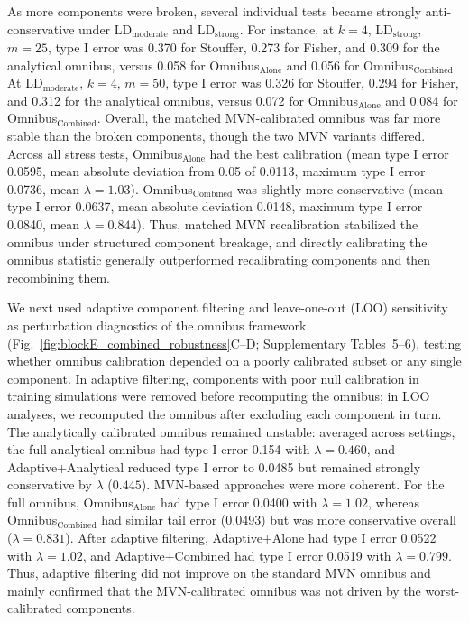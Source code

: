 \documentclass[unnumsec,webpdf,contemporary,large]{oup-authoring-template}%
\theoremstyle{thmstyleone}%
\theoremstyle{thmstyletwo}%
\theoremstyle{thmstylethree}%
\begin{document}
As more components were broken, several individual tests became strongly anti-conservative under LD\(_\text{moderate}\) and LD\(_\text{strong}\). For instance, at \(k=4\), LD\(_\text{strong}\), \(m=25\), type I error was 0.370 for Stouffer, 0.273 for Fisher, and 0.309 for the analytical omnibus, versus 0.058 for Omnibus\(_\text{Alone}\) and 0.056 for Omnibus\(_\text{Combined}\). At LD\(_\text{moderate}\), \(k=4\), \(m=50\), type I error was 0.326 for Stouffer, 0.294 for Fisher, and 0.312 for the analytical omnibus, versus 0.072 for Omnibus\(_\text{Alone}\) and 0.084 for Omnibus\(_\text{Combined}\). Overall, the matched MVN-calibrated omnibus was far more stable than the broken components, though the two MVN variants differed. Across all stress tests, Omnibus\(_\text{Alone}\) had the best calibration (mean type I error 0.0595, mean absolute deviation from 0.05 of 0.0113, maximum type I error 0.0736, mean \(\lambda=1.03\)). Omnibus\(_\text{Combined}\) was slightly more conservative (mean type I error 0.0637, mean absolute deviation 0.0148, maximum type I error 0.0840, mean \(\lambda=0.844\)). Thus, matched MVN recalibration stabilized the omnibus under structured component breakage, and directly calibrating the omnibus statistic generally outperformed recalibrating components and then recombining them.

We next used adaptive component filtering and leave-one-out (LOO) sensitivity as perturbation diagnostics of the omnibus framework (Fig.~\ref{fig:blockE_combined_robustness}C--D; Supplementary Tables~5--6), testing whether omnibus calibration depended on a poorly calibrated subset or any single component. In adaptive filtering, components with poor null calibration in training simulations were removed before recomputing the omnibus; in LOO analyses, we recomputed the omnibus after excluding each component in turn. The analytically calibrated omnibus remained unstable: averaged across settings, the full analytical omnibus had type I error 0.154 with \(\lambda=0.460\), and Adaptive+Analytical reduced type I error to 0.0485 but remained strongly conservative by \(\lambda\) (\(0.445\)). MVN-based approaches were more coherent. For the full omnibus, Omnibus\(_\text{Alone}\) had type I error 0.0400 with \(\lambda=1.02\), whereas Omnibus\(_\text{Combined}\) had similar tail error (0.0493) but was more conservative overall (\(\lambda=0.831\)). After adaptive filtering, Adaptive+Alone had type I error 0.0522 with \(\lambda=1.02\), and Adaptive+Combined had type I error 0.0519 with \(\lambda=0.799\). Thus, adaptive filtering did not improve on the standard MVN omnibus and mainly confirmed that the MVN-calibrated omnibus was not driven by the worst-calibrated components.
\end{document}
